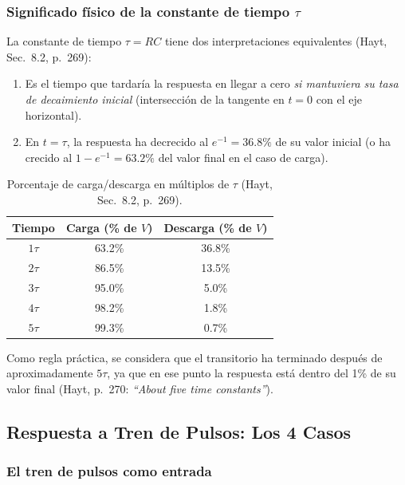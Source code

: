 \documentclass[12pt,a4paper]{article}
\begin{document}
\subsubsection{Significado f\'isico de la constante de tiempo $\tau$}

La constante de tiempo $\tau = RC$ tiene dos interpretaciones equivalentes (Hayt, Sec.~8.2, p.~269):

\begin{enumerate}
    \item Es el tiempo que tardar\'ia la respuesta en llegar a cero \textit{si mantuviera su tasa de decaimiento inicial} (intersecci\'on de la tangente en $t=0$ con el eje horizontal).
    \item En $t = \tau$, la respuesta ha decrecido al $e^{-1} = 36.8\%$ de su valor inicial (o ha crecido al $1 - e^{-1} = 63.2\%$ del valor final en el caso de carga).
\end{enumerate}

\begin{table}[H]
    \centering
    \caption{Porcentaje de carga/descarga en m\'ultiplos de $\tau$ (Hayt, Sec.~8.2, p.~269).}
    \label{tab:tau_valores}
    \begin{tabular}{ccc}
        \toprule
        Tiempo & Carga (\% de $V$) & Descarga (\% de $V$) \\
        \midrule
        $1\tau$ & 63.2\% & 36.8\% \\
        $2\tau$ & 86.5\% & 13.5\% \\
        $3\tau$ & 95.0\% & 5.0\% \\
        $4\tau$ & 98.2\% & 1.8\% \\
        $5\tau$ & 99.3\% & 0.7\% \\
        \bottomrule
    \end{tabular}
\end{table}

Como regla pr\'actica, se considera que el transitorio ha terminado despu\'es de aproximadamente $5\tau$, ya que en ese punto la respuesta est\'a dentro del 1\% de su valor final (Hayt, p.~270: \textit{``About five time constants''}).

\subsection{Respuesta a Tren de Pulsos: Los 4 Casos}

\subsubsection{El tren de pulsos como entrada}
\end{document}
